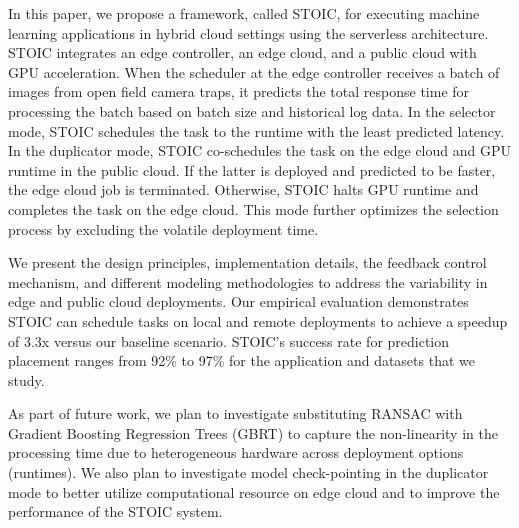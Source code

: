 In this paper, we propose a framework, called STOIC, for executing machine
learning applications in hybrid cloud settings using the serverless
architecture. STOIC integrates an edge controller, an edge cloud, and a public
cloud with GPU acceleration. When the scheduler at the edge controller
receives a batch of images from open field camera traps, it predicts the total
response time for processing the batch based on batch size and historical log
data. In the selector mode, STOIC schedules the task to the runtime with the
least predicted latency. In the duplicator mode, STOIC co-schedules the task
on the edge cloud and GPU runtime in the public cloud. If the latter is
deployed and predicted to be faster, the edge cloud job is terminated.
Otherwise, STOIC halts GPU runtime and completes the task on the edge cloud.
This mode further optimizes the selection process by excluding the volatile
deployment time.

We present the design principles, implementation details, the feedback control
mechanism, and different modeling methodologies to address the variability in
edge and public cloud deployments. Our empirical evaluation demonstrates STOIC
can schedule tasks on local and remote deployments to achieve a speedup of
3.3x versus our baseline scenario. STOIC's success rate for prediction
placement  ranges from 92\% to 97\% for the application and datasets that we
study. 

As part of future work, we plan to investigate substituting RANSAC with
Gradient Boosting Regression Trees (GBRT) to capture the non-linearity in the
processing time due to heterogeneous hardware across deployment options
(runtimes). We also plan to investigate model check-pointing in the duplicator
mode to better utilize computational resource on edge cloud and to improve the
performance of the STOIC system.
